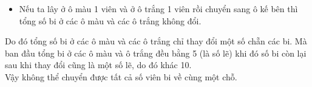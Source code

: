 \begin{ex}
{\begin{enumerate}
{\begin{itemize}
		\item Nếu ta lây ở ô màu 1 viên và ở ô trắng 1 viên rồi chuyển sang ô kế bên thì tổng số bi ở các ô màu và các ô trắng không đổi.
	\end{itemize}}
	{
	}
	Do đó tổng số bi ở các ô màu và các ô trắng chỉ thay đổi một số chẵn các bi. Mà ban đầu tổng bi ở các ô màu và ô trắng đều bằng 5 (là số lẽ) khi đó số bi còn lại sau khi thay đổi cũng là một số lẽ, do đó khác 10. \\
	Vậy không thể chuyển được tất cả số viên bi về cùng một chỗ.
\end{enumerate}
}
\end{ex}

